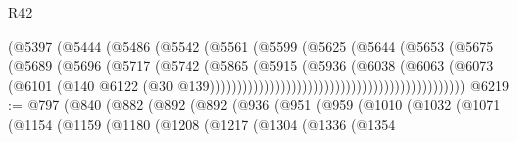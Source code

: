 \begin{lexlean}{R42}
\begin{coremodule}
{                                                    (@5397
                                                      (@5444
                                                        (@5486
                                                          (@5542
                                                            (@5561
                                                              (@5599
                                                                (@5625
                                                                  (@5644
                                                                    (@5653
                                                                      (@5675
                                                                        (@5689
                                                                          (@5696
                                                                            (@5717
                                                                              (@5742
                                                                                (@5865
                                                                                  (@5915
                                                                                    (@5936
                                                                                      (@6038
                                                                                        (@6063
                                                                                          (@6073
                                                                                            (@6101
                                                                                              (@140
                                                                                                @6122
                                                                                                (@30
                                                                                                  @139)))))))))))))))))))))))))))))))))))))))))))))))
@6219 := @797
    (@840
      (@882
        (@892
          (@892
            (@936
              (@951
                (@959
                  (@1010
                    (@1032
                      (@1071
                        (@1154
                          (@1159
                            (@1180
                              (@1208
                                (@1217
                                  (@1304
                                    (@1336
                                      (@1354
}
\end{coremodule}
\end{lexlean}
